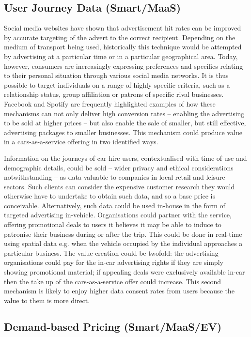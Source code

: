 \documentclass[b5paper,10pt]{article}
\begin{document}
\subsection{User Journey Data (Smart/MaaS)}

Social media websites have shown that advertisement hit rates can be
improved by accurate targeting of the advert to the correct
recipient. Depending on the medium of transport being used,
historically this technique would be attempted by advertising at a
particular time or in a particular geographical area. Today, however,
consumers are increasingly expressing preferences and specifics
relating to their personal situation through various social media
networks. It is thus possible to target individuals on a range of
highly specific criteria, such as a relationship status, group
affiliation or patrons of specific rival businesses.  Facebook and
Spotify are frequently highlighted examples of how these mechanisms
can not only deliver high conversion rates -- enabling the advertising
to be sold at higher prices -- but also enable the sale of smaller,
but still effective, advertising packages to smaller businesses. This
mechanism could produce value in a cars-as-a-service offering in two
identified ways.

Information on the journeys of car hire users, contextualised with
time of use and demographic details, could be sold -- wider privacy
and ethical considerations notwithstanding -- as data valuable to
companies in local retail and leisure sectors. Such clients can
consider the expensive customer research they would otherwise have to
undertake to obtain such data, and so a base price is conceivable.
Alternatively, such data could be used in-house in the form of
targeted advertising in-vehicle. Organisations could partner with the
service, offering promotional deals to users it believes it may be
able to induce to patronise their business during or after the
trip. This could be done in real-time using spatial data e.g. when the
vehicle occupied by the individual approaches a particular
business. The value creation could be twofold: the advertising
organisations could pay for the in-car advertising rights if they are
simply showing promotional material; if appealing deals were
exclusively available in-car then the take up of the cars-as-a-service
offer could increase. This second mechanism is likely to enjoy higher
data consent rates from users because the value to them is more
direct.


\subsection{Demand-based Pricing (Smart/MaaS/EV)}
\end{document}
